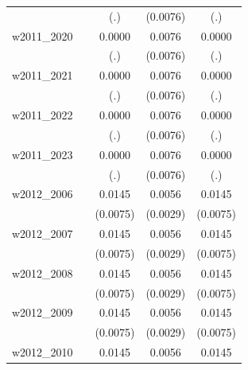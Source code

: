 \begin{table}[htbp]
\begin{tabular}{l*{4}{c}}
            &                     &         (.)         &    (0.0076)         &         (.)         \\
[1em]
w2011\_2020  &                     &      0.0000         &      0.0076         &      0.0000         \\
            &                     &         (.)         &    (0.0076)         &         (.)         \\
[1em]
w2011\_2021  &                     &      0.0000         &      0.0076         &      0.0000         \\
            &                     &         (.)         &    (0.0076)         &         (.)         \\
[1em]
w2011\_2022  &                     &      0.0000         &      0.0076         &      0.0000         \\
            &                     &         (.)         &    (0.0076)         &         (.)         \\
[1em]
w2011\_2023  &                     &      0.0000         &      0.0076         &      0.0000         \\
            &                     &         (.)         &    (0.0076)         &         (.)         \\
[1em]
w2012\_2006  &                     &      0.0145\sym{*}  &      0.0056\sym{*}  &      0.0145\sym{*}  \\
            &                     &    (0.0075)         &    (0.0029)         &    (0.0075)         \\
[1em]
w2012\_2007  &                     &      0.0145\sym{*}  &      0.0056\sym{*}  &      0.0145\sym{*}  \\
            &                     &    (0.0075)         &    (0.0029)         &    (0.0075)         \\
[1em]
w2012\_2008  &                     &      0.0145\sym{*}  &      0.0056\sym{*}  &      0.0145\sym{*}  \\
            &                     &    (0.0075)         &    (0.0029)         &    (0.0075)         \\
[1em]
w2012\_2009  &                     &      0.0145\sym{*}  &      0.0056\sym{*}  &      0.0145\sym{*}  \\
            &                     &    (0.0075)         &    (0.0029)         &    (0.0075)         \\
[1em]
w2012\_2010  &                     &      0.0145\sym{*}  &      0.0056\sym{*}  &      0.0145\sym{*}  \\

\end{tabular}
\end{table}
